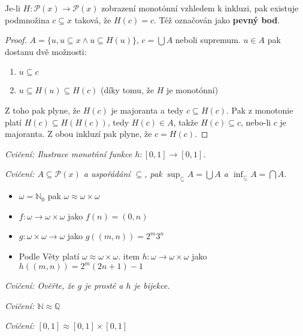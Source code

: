 \begin{lemma}
	Je-li $H: \mathcal{P}(x) \to \mathcal{P}(x)$ zobrazení monotónní vzhledem k inkluzi, pak existuje podmnožina $c \subseteq x$ taková, že $H(c) = c$. Též označován jako \textbf{pevný bod}.
\end{lemma}

\begin{proof}
	$A = \{u, u \subseteq x \land u \subseteq H(u)\}$, $c = \bigcup A$ neboli supremum. $u \in A$ pak dostanu dvě možnosti:
	
	\begin{enumerate}
		\item $u \subseteq c$
		\item $u \subseteq H(u) \subseteq H(c)$ (díky tomu, že $H$ je monotónní)
	\end{enumerate}
	
	Z toho pak plyne, že $H(c)$ je majoranta a tedy $c \subseteq H(c)$. Pak z monotonie platí $H(c) \subseteq H(H(c))$, tedy $H(c) \in A$, takže $H(c) \subseteq c$, nebo-li $c$ je majoranta. Z obou inkluzí pak plyne, že $c = H(c)$.
\end{proof}

\textit{Cvičení: Ilustrace monotńní funkce $h: [0,1] \to [0,1]$.}

\textit{Cvičení: $A \subseteq \mathcal{P}(x)$ a uspořádání $\subseteq$, pak $\sup_{\subseteq} A = \bigcup A$ a $\inf_{\subseteq} A = \bigcap A$.}

\begin{prikl}
	\begin{itemize}
		\item $\omega = \mathbb{N}_{0}$ pak $\omega \approx \omega \times \omega$
		\item $f: \omega \to \omega \times \omega$ jako $f(n) = (0,n)$
		\item $g: \omega\times\omega \to \omega$ jako $g((m,n)) = 2^{m}3^{n}$
		\item Podle Věty platí $\omega \approx \omega \times \omega$.
		item $h: \omega\to\omega\times\omega$ jako $h((m,n)) = 2^{m}(2n+1)-1$
	\end{itemize}
\end{prikl}

\textit{Cvičení: Ověřte, že $g$ je prosté a $h$ je bijekce.}

\textit{Cvičení: $\mathbb{N} \approx \mathbb{Q}$}

\textit{Cvičení: $[0,1] \approx [0,1] \times [0,1]$}


